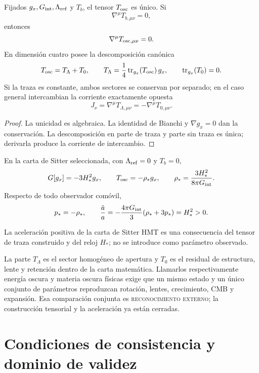 \begin{theorem}
\label{thm:hmtf2-tensor-oscuro}
Fijados \(g_x,G_{\rm int},\Lambda_{\rm ref}\) y \(T_b\), el tensor
\(T_{\rm osc}\) es único. Si
\[
 \nabla^\mu T_{b,\mu\nu}=0,
 \]
entonces
\[
 \nabla^\mu T_{{\rm osc},\mu\nu}=0.
\]
En dimensión cuatro posee la descomposición canónica
\[
 T_{\rm osc}=T_\Lambda+T_0,\qquad
 T_\Lambda=\frac14\operatorname{tr}_{g_x}(T_{\rm osc})\,g_x,\qquad
 \operatorname{tr}_{g_x}(T_0)=0.
\]
Si la traza es constante, ambos sectores se conservan por separado; en el
caso general intercambian la corriente exactamente opuesta
\[
 J_\nu=\nabla^\mu T_{\Lambda,\mu\nu}
 =-\nabla^\mu T_{0,\mu\nu}.
\]
\end{theorem}

\begin{proof}
La unicidad es algebraica. La identidad de Bianchi y
\(\nabla g_x=0\) dan la conservación. La descomposición en parte de traza y
parte sin traza es única; derivarla produce la corriente de intercambio.
\end{proof}

En la carta de Sitter seleccionada, con
\(\Lambda_{\rm ref}=0\) y \(T_b=0\),
\[
 G[g_x]=-3H_*^2g_x,\qquad
 T_{\rm osc}=-\rho_*g_x,\qquad
 \rho_*=\frac{3H_*^2}{8\pi G_{\rm int}}.
\]
Respecto de todo observador comóvil,
\[
 p_*=-\rho_*,
 \qquad
 \frac{\ddot a}{a}
 =-\frac{4\pi G_{\rm int}}3(\rho_*+3p_*)=H_*^2>0.
\]

\begin{corollary}
\label{cor:hmtf2-aceleracion}
La aceleración positiva de la carta de Sitter HMT es una consecuencia del
tensor de traza construido y del reloj \(H_*\); no se introduce como
parámetro observado.
\end{corollary}

La parte \(T_\Lambda\) es el sector homogéneo de apertura y \(T_0\) es el
residual de estructura, lente y retención dentro de la carta matemática.
Llamarlos respectivamente energía oscura y materia oscura físicas exige que
un mismo estado y un único conjunto de parámetros reproduzcan rotación,
lentes, crecimiento, CMB y expansión. Esa comparación conjunta es
\textsc{reconocimiento externo}; la construcción tensorial y la aceleración
ya están cerradas.

\section{Condiciones de consistencia y dominio de validez}
\label{sec:hmtf2-falsadores}

